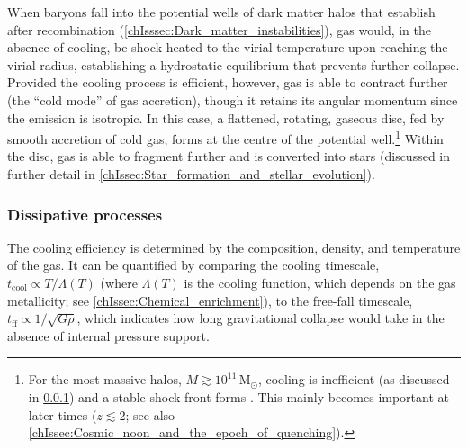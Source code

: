 When baryons fall into the potential wells of dark matter halos that establish after recombination (\cref{chIsssec:Dark_matter_instabilities}), gas would, in the absence of cooling, be shock-heated to the virial temperature upon reaching the virial radius, establishing a hydrostatic equilibrium that prevents further collapse. Provided the cooling process is efficient, however, gas is able to contract further (the ``cold mode'' of gas accretion), though it retains its angular momentum since the emission is isotropic. In this case, a flattened, rotating, gaseous disc, fed by smooth accretion of cold gas, forms at the centre of the potential well.\footnote{For the most massive halos, $M \gtrsim 10^{11} \, \mathrm{M_\odot}$, cooling is inefficient (as discussed in \cref{chIsssec:Dissipative_processes}) and a stable shock front forms \citep[``hot-mode'' accretion;][]{2003MNRAS.345..349B}. This mainly becomes important at later times ($z \lesssim 2$; see also \cref{chIssec:Cosmic_noon_and_the_epoch_of_quenching}).} Within the disc, gas is able to fragment further and is converted into stars (discussed in further detail in \cref{chIssec:Star_formation_and_stellar_evolution}).

\subsubsection{Dissipative processes}
\label{chIsssec:Dissipative_processes}

The cooling efficiency is determined by the composition, density, and temperature of the gas. It can be quantified by comparing the cooling timescale, $t_\text{cool} \propto T/\Lambda(T)$ (where $\Lambda(T)$ is the cooling function, which depends on the gas metallicity; see \cref{chIssec:Chemical_enrichment}), to the free-fall timescale, $t_\text{ff} \propto 1/\sqrt{G\rho}$, which indicates how long gravitational collapse would take in the absence of internal pressure support.

